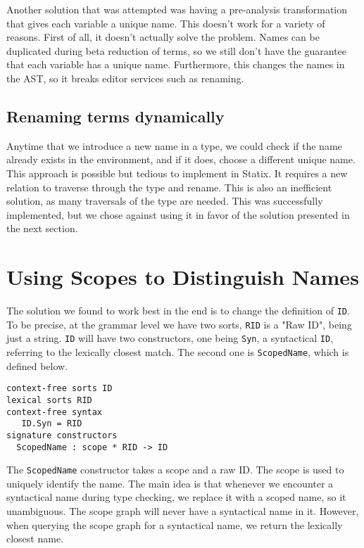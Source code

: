 Another solution that was attempted was having a pre-analysis transformation that gives each variable a unique name. This doesn't work for a variety of reasons. First of all, it doesn't actually solve the problem. Names can be duplicated during beta reduction of terms, so we still don't have the guarantee that each variable has a unique name. Furthermore, this changes the names in the AST, so it breaks editor services such as renaming.

\subsection{Renaming terms dynamically}

Anytime that we introduce a new name in a type, we could check if the name already exists in the environment, and if it does, choose a different unique name. This approach is possible but tedious to implement in Statix. It requires a new relation to traverse through the type and rename. This is also an inefficient solution, as many traversals of the type are needed. This was successfully implemented, but we chose against using it in favor of the solution presented in the next section.

\section{Using Scopes to Distinguish Names}
\label{scopes_for_names}

The solution we found to work best in the end is to change the definition of \verb|ID|. To be precise, at the grammar level we have two sorts, \verb|RID| is a "Raw ID", being just a string. \verb|ID| will have two constructors, one being \verb|Syn|, a syntactical \verb|ID|, referring to the lexically closest match. The second one is \verb|ScopedName|, which is defined below.

\begin{lstlisting}
context-free sorts ID
lexical sorts RID
context-free syntax
   ID.Syn = RID
signature constructors
  ScopedName : scope * RID -> ID
\end{lstlisting}

The \verb|ScopedName| constructor takes a scope and a raw ID. The scope is used to uniquely identify the name. The main idea is that whenever we encounter a syntactical name during type checking, we replace it with a scoped name, so it unambiguous. The scope graph will never have a syntactical name in it. However, when querying the scope graph for a syntactical name, we return the lexically closest name.

